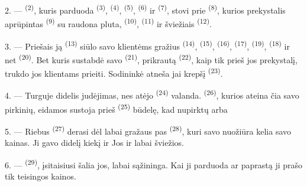 2. ---  \textsuperscript{(2)}, kuris parduoda
 \textsuperscript{(3)},  \textsuperscript{(4)},
 \textsuperscript{(5)},  \textsuperscript{(6)} ir
 \textsuperscript{(7)}, stovi prie  \textsuperscript{(8)}, kurios prekystalis aprūpintas
 \textsuperscript{(9)} su raudona pluta,
 \textsuperscript{(10)}, 
\textsuperscript{(11)} ir šviežiais  \textsuperscript{(12)}.

3. --- Priešais ją  \textsuperscript{(13)} siūlo savo
klientėms gražius  \textsuperscript{(14)},  \textsuperscript{(15)},  \textsuperscript{(16)},
 \textsuperscript{(17)}, 
\textsuperscript{(19)},  \textsuperscript{(18)} ir net
 \textsuperscript{(20)}. Bet  kuris
sustabdė savo  \textsuperscript{(21)}, prikrautą
 \textsuperscript{(22)}, kaip tik prieš jos prekystalį, trukdo
jos klientams prieiti. Sodininkė atneša jai krepšį 
\textsuperscript{(23)}.

\VUsaut{4.0mm}
\VUsaut{3.0mm}

4. --- Turguje didelis judėjimas, nes atėjo  \textsuperscript{(24)}
valanda.  \textsuperscript{(26)}, kurios ateina čia savo pirkinių,
eidamos sustoja prieš  \textsuperscript{(25)} būdelę,
kad nupirktų  arba 

5. --- Riebus  \textsuperscript{(27)} derasi dėl labai gražaus
 pas  \textsuperscript{(28)}, kuri savo nuožiūra
kelia savo kainas. Ji gavo didelį kiekį  ir
 Jos  ir  labai šviežios.

\VUsaut{4.0mm}
\VUsaut{3.0mm}

6. ---  \textsuperscript{(29)}, įsitaisiusi šalia jos,
labai sąžininga. Kai ji parduoda  ar paprastą
 ji prašo tik teisingos kainos.

